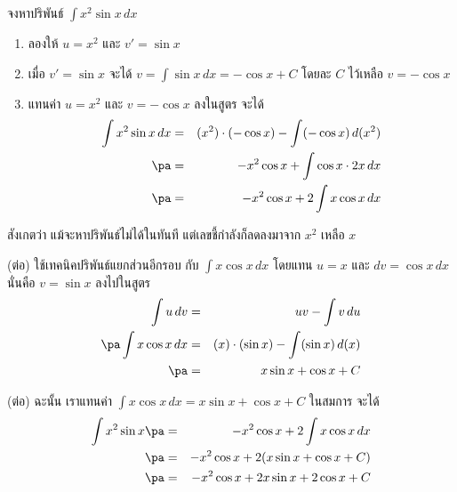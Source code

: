 \begin{frame}[t]
\begin{ex}
จงหาปริพันธ์ $\int x^2 \sin x \, dx$
\end{ex}
\begin{sol}
\begin{enumerate}
\item ลองให้ $u = x^2$ และ $v' = \sin x$ \pa
\item เมื่อ $v' = \sin x$ \pa จะได้ $v = \int \sin x\, dx = -\cos x + C$ โดยละ $C$ ไว้เหลือ $v = -\cos x$ \pa
\item แทนค่า $u = x^2$ และ $v = -\cos x$ ลงในสูตร จะได้\pa
\begin{eqnarray*}
\int x^2 \sin x\, dx &=& (x^2) \cdot (-\cos x) - \int (-\cos x) \, d (x^2)\\ \pa
&=& -x^2 \cos x + \int \cos x \cdot 2x \, dx \\ \pa
&=& -x^2 \cos x+ 2 \int x \cos x\, dx
\end{eqnarray*}
\end{enumerate}
สังเกตว่า แม้จะหาปริพันธ์ไม่ได้ในทันที แต่เลขชี้กำลังก็ลดลงมาจาก $x^2$ เหลือ $x$
\end{sol}
\end{frame}

\begin{frame}
\begin{sol} (ต่อ)
ใช้เทคนิคปริพันธ์แยกส่วนอีกรอบ กับ $\int x \cos x \, dx$ โดยแทน $u = x$ และ $dv = \cos x \, dx$ นั่นคือ $v = \sin x$ ลงไปในสูตร \pa
\begin{eqnarray*}
\int u \, dv &=& uv - \int v\, du \\ \pa
\int x \cos x\, dx &=& (x) \cdot (\sin x) - \int (\sin x) \, d (x) \\ \pa
&=& x\sin x + \cos x + C
\end{eqnarray*}
\end{sol}
\end{frame}

\begin{frame}
\begin{sol} (ต่อ)
ฉะนั้น เราแทนค่า $\int x \cos x \, dx = x\sin x + \cos x + C$ ในสมการ จะได้
\begin{eqnarray*} 
\int x^2 \sin x \pa &=& -x^2 \cos x + 2 \int x \cos x \, dx \\ \pa
&=& -x^2 \cos x + 2(x\sin x + \cos x + C)\\ \pa
&=& -x^2 \cos x + 2x\sin x + 2\cos x + C
\end{eqnarray*}
\end{sol}
\end{frame}


